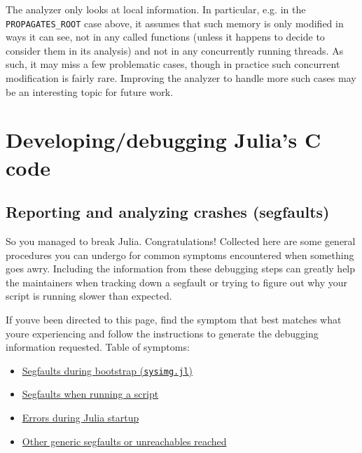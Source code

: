 The analyzer only looks at local information. In particular, e.g. in the \texttt{PROPAGATES\_ROOT} case above, it assumes that such memory is only modified in ways it can see, not in any called functions (unless it happens to decide to consider them in its analysis) and not in any concurrently running threads. As such, it may miss a few problematic cases, though in practice such concurrent modification is fairly rare. Improving the analyzer to handle more such cases may be an interesting topic for future work.



\chapter{Developing/debugging Julia's C code}


\hypertarget{11376306494480499528}{}


\section{Reporting and analyzing crashes (segfaults)}



So you managed to break Julia.  Congratulations!  Collected here are some general procedures you can undergo for common symptoms encountered when something goes awry.  Including the information from these debugging steps can greatly help the maintainers when tracking down a segfault or trying to figure out why your script is running slower than expected.



If you{\textquotesingle}ve been directed to this page, find the symptom that best matches what you{\textquotesingle}re experiencing and follow the instructions to generate the debugging information requested.  Table of symptoms:



\begin{itemize}
\item \hyperlink{13671941627037387928}{Segfaults during bootstrap (\texttt{sysimg.jl})}


\item \hyperlink{17238593239204343556}{Segfaults when running a script}


\item \hyperlink{15906783386188107842}{Errors during Julia startup}


\item \hyperlink{9648352711765890842}{Other generic segfaults or unreachables reached}

\end{itemize}



